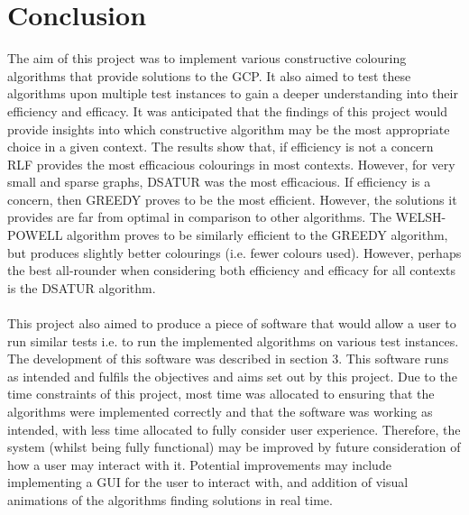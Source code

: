 \section{Conclusion}

The aim of this project was to implement various constructive colouring algorithms that provide solutions to the GCP. It also aimed to test these algorithms upon multiple test instances to gain a deeper understanding into their efficiency and efficacy. It was anticipated that the findings of this project would provide insights into which constructive algorithm may be the most appropriate choice in a given context. The results show that, if efficiency is not a concern RLF provides the most efficacious colourings in most contexts. However, for very small and sparse graphs, DSATUR was the most efficacious. If efficiency is a concern, then GREEDY proves to be the most efficient. However, the solutions it provides are far from optimal in comparison to other algorithms. The WELSH-POWELL algorithm proves to be similarly efficient to the GREEDY algorithm, but produces slightly better colourings (i.e. fewer colours used). However, perhaps the best all-rounder when considering both efficiency and efficacy for all contexts is the DSATUR algorithm. 
\\\\
This project also aimed to produce a piece of software that would allow a user to run similar tests i.e. to run the implemented algorithms on various test instances. The development of this software was described in section 3. This software runs as intended and fulfils the objectives and aims set out by this project. Due to the time constraints of this project, most time was allocated to ensuring that the algorithms were implemented correctly and that the software was working as intended, with less time allocated to fully consider user experience. Therefore, the system (whilst being fully functional) may be improved by future consideration of how a user may interact with it. Potential improvements may include implementing a GUI for the user to interact with, and addition of visual animations of the algorithms finding solutions in real time. 
\\\\
